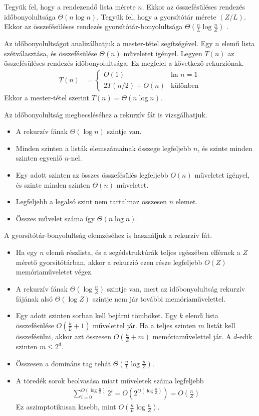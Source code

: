 \documentclass[12pt]{report}
\begin{document}
Tegyük fel, hogy a rendezendő lista mérete $n$.
Ekkor az összefésüléses rendezés időbonyolultsága $\Theta(n \log{n})$.
Tegyük fel, hogy a gyorsítótár mérete $(Z/L)$.
Ekkor az összefésüléses rendezés gyorsítótár-bonyolultsága
$\Theta(\frac{n}{L}\log{\frac{n}{Z}})$ \cite{prokop}.

Az időbonyolultságot analizálhatjuk a mester-tétel\cite{algoritmusok} segítségével.
Egy $n$ elemű lista szétválasztása, és összefésülése $\Theta(n)$ műveletet igényel.
Legyen $T(n)$ az összefésüléses rendezés időbonyolultsága.
Ez megfelel a következő rekurziónak.
\begin{align*}
T(n) &=
  \begin{cases}
   O(1) & \text{ha } n=1 \\
   2T(n/2)+O(n) & \text{különben}
  \end{cases}
\end{align*}
Ekkor a mester-tétel szerint $T(n) = \Theta(n \log{n})$.

Az időbonyolultság megbecsléséhez a rekurzív fát is vizsgálhatjuk.
\begin{itemize}
\item A rekurzív fának $\Theta(\log{n})$ szintje van.
\item Minden szinten a listák elemszámainak összege legfeljebb $n$,
és szinte minden szinten egyenlő $n$-nel.
\item Egy adott szinten az összes összefésülés legfeljebb $O(n)$ műveletet igényel,
és szinte minden szinten $\Theta(n)$ műveletet.
\item Legfeljebb a legalsó szint nem tartalmaz összesen $n$ elemet.
\item Összes művelet száma így $\Theta(n \log{n})$.
\end{itemize}

A gyorsítótár-bonyolultság elemzéséhez is használjuk a rekurzív fát.
\begin{itemize}
\item Ha egy $n$ elemű részlista, és a segédstruktúrák
teljes egészében elférnek a $Z$ mérető gyorsítótárban,
akkor a rekurzió ezen része legfeljebb $O(Z)$ memóriaműveletet végez.
\item A rekurzív fának $\Theta(\log{\frac{n}{Z}})$ szintje van,
mert az időbonyolultság rekurzív fájának alsó $\Theta(\log{Z})$
szintje nem jár további memóriaművelettel.
\item Egy adott szinten sorban kell bejárni tömböket.
Egy $k$ elemű lista összefésülése $O(\frac{k}{L}+1)$ művelettel jár.
Ha a teljes szinten $m$ listát kell összefésülni,
akkor azt összesen $O(\frac{n}{Z}+m)$ memóriaművelettel jár.
A $d$-edik szinten $m \le 2^d$.
\item Összesen a domináns tag tehát $\Theta(\frac{n}{L}\log{\frac{n}{Z}})$.
\item A töredék sorok beolvasása miatt műveletek száma legfeljebb
\begin{align*}
\sum_{i=0}^{O(\log{\frac{n}{Z}})} 2^i
= O\left( 2^{O(\log{\frac{n}{Z}})} \right)
= O\left(\frac{n}{Z}\right)
\end{align*}
Ez aszimptotikusan kisebb, mint $O(\frac{n}{L}\log{\frac{n}{Z}})$.
\end{itemize}
\end{document}
